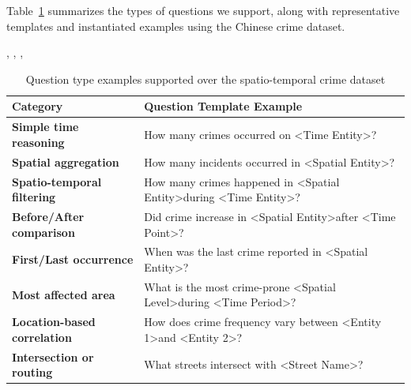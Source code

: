 Table~\ref{tab:dataset_questions} summarizes the types of questions we support, along with representative templates and instantiated examples using the Chinese crime dataset.


\cite{Unsloth2024Dataset1}, \cite{Unsloth2024WhatModel}, \cite{Li2024NuminaMath}, \cite{Yin2024MuMathCode}

\begin{table}[H]
    \centering
    \caption{Question type examples supported over the spatio-temporal crime dataset}
    \label{tab:dataset_questions}
    \begin{tabular}{|p{4.5cm}|p{10cm}|}
    \hline
    \textbf{Category} & \textbf{Question Template Example} \\
    \hline
    \textbf{Simple time reasoning} & How many crimes occurred on \textless Time Entity\textgreater? \\
    \hline
    \textbf{Spatial aggregation} & How many incidents occurred in \textless Spatial Entity\textgreater? \\
    \hline
    \textbf{Spatio-temporal filtering} & How many crimes happened in \textless Spatial Entity\textgreater during \textless Time Entity\textgreater? \\
    \hline
    \textbf{Before/After comparison} & Did crime increase in \textless Spatial Entity\textgreater after \textless Time Point\textgreater? \\
    \hline
    \textbf{First/Last occurrence} & When was the last crime reported in \textless Spatial Entity\textgreater? \\
    \hline
    \textbf{Most affected area} & What is the most crime-prone \textless Spatial Level\textgreater during \textless Time Period\textgreater? \\
    \hline
    \textbf{Location-based correlation} & How does crime frequency vary between \textless Entity 1\textgreater and \textless Entity 2\textgreater? \\
    \hline
    \textbf{Intersection or routing} & What streets intersect with \textless Street Name\textgreater? \\
    \hline
    \end{tabular}
\end{table}
    



